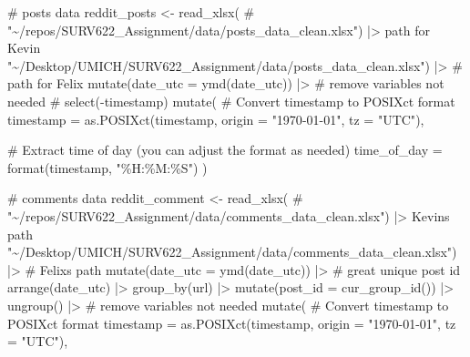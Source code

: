 \documentclass[
  letterpaper,
  DIV=11,
  numbers=noendperiod]{scrartcl}
\newenvironment{Shaded}{\begin{snugshade}}{\end{snugshade}}
\newcommand{\AttributeTok}[1]{\textcolor[rgb]{0.40,0.45,0.13}{#1}}
\newcommand{\CommentTok}[1]{\textcolor[rgb]{0.37,0.37,0.37}{#1}}
\newcommand{\FunctionTok}[1]{\textcolor[rgb]{0.28,0.35,0.67}{#1}}
\newcommand{\NormalTok}[1]{\textcolor[rgb]{0.00,0.23,0.31}{#1}}
\newcommand{\OtherTok}[1]{\textcolor[rgb]{0.00,0.23,0.31}{#1}}
\newcommand{\SpecialCharTok}[1]{\textcolor[rgb]{0.37,0.37,0.37}{#1}}
\newcommand{\StringTok}[1]{\textcolor[rgb]{0.13,0.47,0.30}{#1}}
\begin{document}
\begin{Shaded}
\begin{Highlighting}[]
\CommentTok{\# posts data}
\NormalTok{reddit\_posts }\OtherTok{\textless{}{-}} \FunctionTok{read\_xlsx}\NormalTok{(}
  \CommentTok{\# "\textasciitilde{}/repos/SURV622\_Assignment/data/posts\_data\_clean.xlsx") |\textgreater{} path for Kevin}
  \StringTok{"\textasciitilde{}/Desktop/UMICH/SURV622\_Assignment/data/posts\_data\_clean.xlsx"}\NormalTok{) }\SpecialCharTok{|\textgreater{}} \CommentTok{\# path for Felix}
  \FunctionTok{mutate}\NormalTok{(}\AttributeTok{date\_utc =} \FunctionTok{ymd}\NormalTok{(date\_utc)) }\SpecialCharTok{|\textgreater{}} 
  \CommentTok{\# remove variables not needed}
  \CommentTok{\# select({-}timestamp)}
  \FunctionTok{mutate}\NormalTok{(}
    \CommentTok{\# Convert timestamp to POSIXct format}
    \AttributeTok{timestamp =} \FunctionTok{as.POSIXct}\NormalTok{(timestamp, }\AttributeTok{origin =} \StringTok{"1970{-}01{-}01"}\NormalTok{, }\AttributeTok{tz =} \StringTok{"UTC"}\NormalTok{),}
    
    \CommentTok{\# Extract time of day (you can adjust the format as needed)}
    \AttributeTok{time\_of\_day =} \FunctionTok{format}\NormalTok{(timestamp, }\StringTok{"\%H:\%M:\%S"}\NormalTok{)}
\NormalTok{  )}


\CommentTok{\# comments data}
\NormalTok{reddit\_comment }\OtherTok{\textless{}{-}} \FunctionTok{read\_xlsx}\NormalTok{(}
  \CommentTok{\# "\textasciitilde{}/repos/SURV622\_Assignment/data/comments\_data\_clean.xlsx") |\textgreater{} Kevin\textquotesingle{}s path}
  \StringTok{"\textasciitilde{}/Desktop/UMICH/SURV622\_Assignment/data/comments\_data\_clean.xlsx"}\NormalTok{) }\SpecialCharTok{|\textgreater{}} \CommentTok{\# Felix\textquotesingle{}s path}
    \FunctionTok{mutate}\NormalTok{(}\AttributeTok{date\_utc =} \FunctionTok{ymd}\NormalTok{(date\_utc)) }\SpecialCharTok{|\textgreater{}} 
  \CommentTok{\# great unique post id}
  \FunctionTok{arrange}\NormalTok{(date\_utc) }\SpecialCharTok{|\textgreater{}} 
  \FunctionTok{group\_by}\NormalTok{(url) }\SpecialCharTok{|\textgreater{}} 
  \FunctionTok{mutate}\NormalTok{(}\AttributeTok{post\_id =} \FunctionTok{cur\_group\_id}\NormalTok{()) }\SpecialCharTok{|\textgreater{}} 
  \FunctionTok{ungroup}\NormalTok{() }\SpecialCharTok{|\textgreater{}} 
  \CommentTok{\# remove variables not needed}
  \FunctionTok{mutate}\NormalTok{(}
    \CommentTok{\# Convert timestamp to POSIXct format}
    \AttributeTok{timestamp =} \FunctionTok{as.POSIXct}\NormalTok{(timestamp, }\AttributeTok{origin =} \StringTok{"1970{-}01{-}01"}\NormalTok{, }\AttributeTok{tz =} \StringTok{"UTC"}\NormalTok{),}
    

\end{Highlighting}
\end{Shaded}
\end{document}
